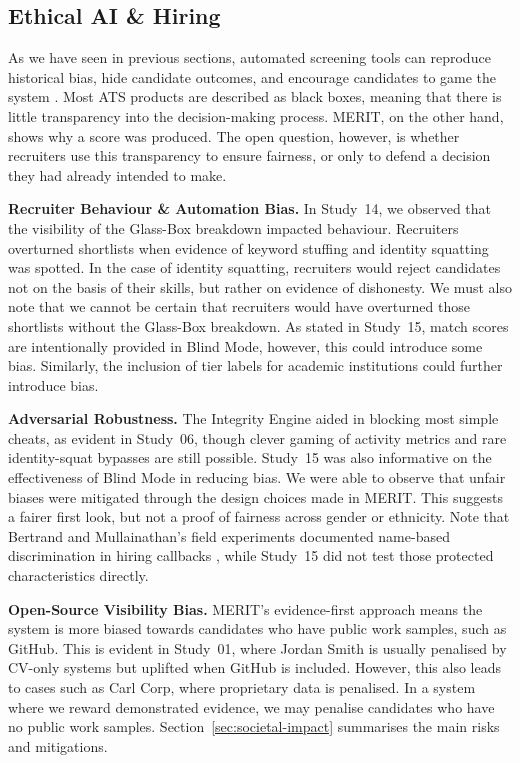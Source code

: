 \subsection{Ethical AI \& Hiring}
\label{sec:ethical-ai-hiring}

As we have seen in previous sections, automated screening tools can reproduce historical bias, hide candidate outcomes, and encourage
candidates to game the system \cite{bogen2018,raghavan2020,fabris2025fairness}. Most ATS products are described as black boxes, meaning that
there is little transparency into the decision-making process. MERIT, on the other hand, shows why a score was produced. The open question,
however, is whether recruiters use this transparency to ensure fairness, or only to defend a decision they had already intended to make.

\textbf{Recruiter Behaviour \& Automation Bias.} In Study~14, we observed that the visibility of the Glass-Box breakdown impacted behaviour. Recruiters overturned shortlists when evidence
of keyword stuffing and identity squatting was spotted. In the case of identity squatting, recruiters would reject candidates not on the basis
of their skills, but rather on evidence of dishonesty. We must also note that we cannot be certain that recruiters would have overturned
those shortlists without the Glass-Box breakdown. As stated in Study~15, match scores are intentionally provided in Blind Mode, however, this
could introduce some bias. Similarly, the inclusion of tier labels for academic institutions could further introduce bias.

\textbf{Adversarial Robustness.} The Integrity Engine aided in blocking most simple cheats, as evident in Study~06, though clever gaming of activity metrics and rare
identity-squat bypasses are still possible. Study~15 was also informative on the effectiveness of Blind Mode in reducing bias. We were able
to observe that unfair biases were mitigated through the design choices made in MERIT. This suggests a fairer first look, but not a proof of
fairness across gender or ethnicity. Note that Bertrand and Mullainathan's field experiments documented name-based discrimination in hiring
callbacks \cite{bertrand2004}, while Study~15 did not test those protected characteristics directly.

\textbf{Open-Source Visibility Bias.} MERIT's evidence-first approach means the system is more biased towards candidates who have public work samples, such as GitHub.
This is evident in Study~01, where Jordan Smith is usually penalised by CV-only systems but uplifted when GitHub is included.
However, this also leads to cases such as Carl Corp, where proprietary data is penalised. In a system where we reward demonstrated evidence,
we may penalise candidates who have no public work samples. Section~\ref{sec:societal-impact} summarises the main risks and mitigations.
